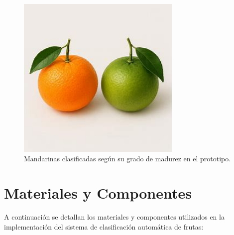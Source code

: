 \begin{figure}[H]
    \centering
    \includegraphics[width=0.7\textwidth]{./assets/mandarinas.jpeg}
    \caption{Mandarinas clasificadas según su grado de madurez en el prototipo.}
    \label{fig:mandarinas}
\end{figure}

\newpage
\section{Materiales y Componentes}

A continuación se detallan los materiales y componentes utilizados en la implementación del sistema de clasificación automática de frutas:

